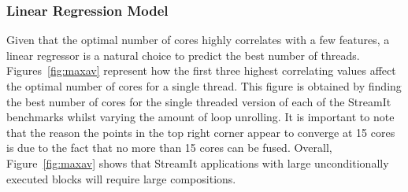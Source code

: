 \subsubsection{Linear Regression Model}
Given that the optimal number of cores highly correlates with a few features, a linear regressor is a natural choice to predict the best number of threads.
Figures~\ref{fig:maxav} represent how the first three highest correlating values affect the optimal number of cores for a single thread.
This figure is obtained by finding the best number of cores for the single threaded version of each of the StreamIt benchmarks whilst varying the amount of loop unrolling.
It is important to note that the reason the points in the top right corner appear to converge at 15 cores is due to the fact that no more than 15 cores can be fused.
Overall, Figure~\ref{fig:maxav} shows that StreamIt applications with large unconditionally executed blocks will require large compositions.


